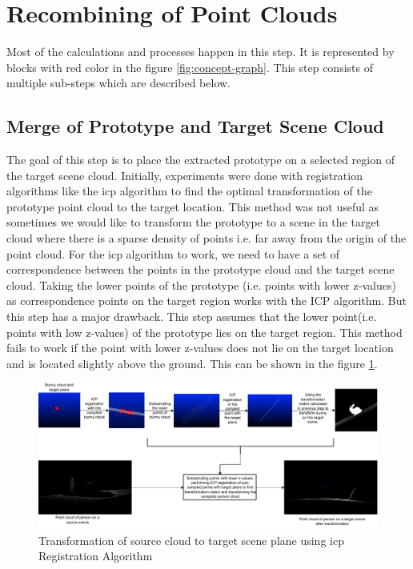 \section{Recombining of Point Clouds}
Most of the calculations and processes happen in this step. It is represented by blocks with red color in the figure \ref{fig:concept-graph}. This step consists of multiple sub-steps which are described below.

\subsection{Merge of Prototype and Target Scene Cloud}
The goal of this step is to place the extracted prototype on a selected region of the target scene cloud. Initially, experiments were done with registration algorithms like the \acrfull{icp} algorithm to find the optimal transformation of the prototype point cloud to the target location. This method was not useful as sometimes we would like to transform the prototype to a scene in the target cloud where there is a sparse density of points i.e. far away from the origin of the point cloud. For the \acrshort{icp} algorithm to work, we need to have a set of correspondence between the points in the prototype cloud and the target scene cloud. Taking the lower points of the prototype (i.e. points with lower z-values) as correspondence points on the target region works with the ICP algorithm. But this step has a major drawback. This step assumes that the lower point(i.e. points with low z-values) of the prototype lies on the target region. This method fails to work if the point with lower z-values does not lie on the target location and is located slightly above the ground. This can be shown in the figure \ref{fig:icp_registration_analaysis}.

\begin{figure}[htbp]
    \centering
    \includegraphics[width=1\linewidth]{97_graphics/concepts/icp_registration_analysis.pdf}
    \caption{Transformation of source cloud to target scene plane using \acrshort{icp} Registration Algorithm}
    \label{fig:icp_registration_analaysis}
\end{figure}


